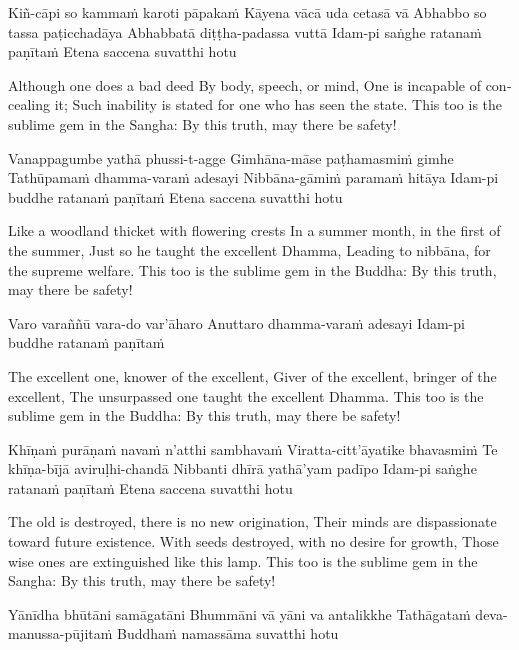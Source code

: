 Kiñ-cāpi so kammaṁ karoti pāpakaṁ
Kāyena vācā uda cetasā vā
Abhabbo so tassa paṭicchadāya
Abhabbatā diṭṭha-padassa vuttā
Idam-pi saṅghe ratanaṁ paṇītaṁ
Etena saccena suvatthi hotu

\begin{english}
  Although one does a bad deed
  By body, speech, or mind,
  One is incapable of concealing it;
  Such inability is stated for one who has seen the state.
  This too is the sublime gem in the Sangha:
  By this truth, may there be safety!
\end{english}

Vanappagumbe yathā phussi-t-agge
Gimhāna-māse paṭhamasmiṁ gimhe
Tathūpamaṁ dhamma-varaṁ adesayi
Nibbāna-gāmiṁ paramaṁ hitāya
Idam-pi buddhe ratanaṁ paṇītaṁ
Etena saccena suvatthi hotu

\begin{english}
  Like a woodland thicket with flowering crests
  In a summer month, in the first of the summer,
  Just so he taught the excellent Dhamma,
  Leading to nibbāna, for the supreme welfare.
  This too is the sublime gem in the Buddha:
  By this truth, may there be safety!
\end{english}

Varo varaññū vara-do var’āharo
Anuttaro dhamma-varaṁ adesayi
Idam-pi buddhe ratanaṁ paṇītaṁ

\begin{english}
  The excellent one, knower of the excellent,
  Giver of the excellent, bringer of the excellent,
  The unsurpassed one taught the excellent Dhamma.
  This too is the sublime gem in the Buddha:
  By this truth, may there be safety!
\end{english}

Khīṇaṁ purāṇaṁ navaṁ n’atthi sambhavaṁ
Viratta-citt’āyatike bhavasmiṁ
Te khīṇa-bījā aviruḷhi-chandā
Nibbanti dhīrā yathā’yam padīpo
Idam-pi saṅghe ratanaṁ paṇītaṁ
Etena saccena suvatthi hotu

\begin{english}
  The old is destroyed, there is no new origination,
  Their minds are dispassionate toward future existence.
  With seeds destroyed, with no desire for growth,
  Those wise ones are extinguished like this lamp.
  This too is the sublime gem in the Sangha:
  By this truth, may there be safety!
\end{english}

Yānīdha bhūtāni samāgatāni
Bhummāni vā yāni va antalikkhe
Tathāgataṁ deva-manussa-pūjitaṁ
Buddhaṁ namassāma suvatthi hotu

